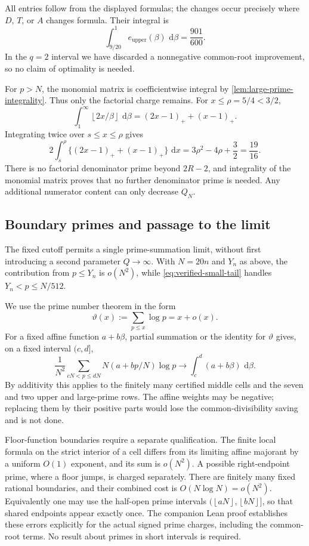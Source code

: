 \documentclass[11pt,letterpaper]{article}
\theoremstyle{definition}
\newcommand{\dd}{\,\mathrm d}
\newcommand{\floor}[1]{\left\lfloor #1\right\rfloor}
\begin{document}
All entries follow from the displayed formulas; the changes occur precisely
where $D$, $T$, or $A$ changes formula. Their integral is
\begin{equation}\label{eq:upper-table-area}
 \int_{9/20}^{1}e_{\mathrm{upper}}(\beta)\,\dd\beta
 =\frac{901}{600}.
\end{equation}
In the $q=2$ interval we have discarded a nonnegative common-root
improvement, so no claim of optimality is needed.

For $p>N$, the monomial matrix is coefficientwise integral by
\cref{lem:large-prime-integrality}. Thus only the factorial charge remains.
For $x\le\rho=5/4<3/2$,
\[
 \int_1^\infty\floor{2x/\beta}\,\dd\beta
 =(2x-1)_++(x-1)_+.
\]
Integrating twice over $s\le x\le\rho$ gives
\begin{equation}\label{eq:large-prime-area}
 2\int_s^\rho\{(2x-1)_++(x-1)_+\}\,\dd x
 =3\rho^2-4\rho+\frac32=\frac{19}{16}.
\end{equation}
There is no factorial denominator prime beyond $2R-2$, and integrality
of the monomial matrix proves that no further denominator prime is needed.
Any additional numerator content can only decrease $Q_N$.

\subsection{Boundary primes and passage to the limit}
The fixed cutoff permits a single prime-summation limit, without first
introducing a second parameter $Q\to\infty$. With $N=20n$ and $Y_n$
as above, the contribution from $p\le Y_n$ is $o(N^2)$, while
\eqref{eq:verified-small-tail} handles $Y_n<p\le N/512$.

We use the prime number theorem \cite[\S27.12]{dlmf} in the form
\begin{equation}\label{eq:pnt}
 \vartheta(x):=\sum_{p\le x}\log p=x+o(x).
\end{equation}
For a fixed affine function $a+b\beta$, partial summation or the
identity for $\vartheta$ gives, on a fixed interval $(c,d]$,
\[
 \frac1{N^2}\sum_{cN<p\le dN}
 N(a+bp/N)\log p
 \longrightarrow\int_c^d(a+b\beta)\,\dd\beta.
\]
By additivity this applies to the finitely many certified middle
cells and the seven and two upper and large-prime rows. The affine
weights may be negative; replacing them by their positive parts would
lose the common-divisibility saving and is not done.

Floor-function boundaries require a separate qualification. The
finite local formula on the strict interior of a cell differs from
its limiting affine majorant by a uniform $O(1)$ exponent, and its
sum is $o(N^2)$. A possible right-endpoint prime, where a floor jumps,
is charged separately. There are finitely many fixed rational boundaries,
and their combined cost is $O(N\log N)=o(N^2)$. Equivalently one may
use the half-open prime intervals $(\floor{aN},\floor{bN}]$, so that
shared endpoints appear exactly once. The companion Lean proof
establishes these errors explicitly for the actual signed prime
charges, including the common-root terms. No result about primes in
short intervals is required.
\end{document}
